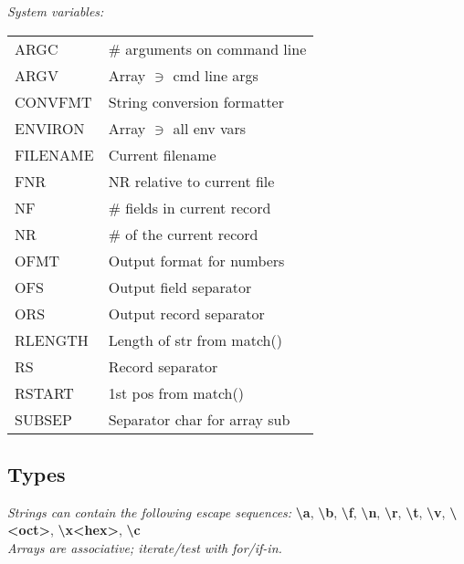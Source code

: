 \textit{System variables:}\\
{\footnotesize \begin{tabular}{l l}
    ARGC	& \# arguments on command line		\\
    ARGV	& Array $\ni$ cmd line args		\\
    CONVFMT	& String conversion formatter		\\
    ENVIRON	& Array $\ni$ all env vars		\\
    FILENAME	& Current filename			\\
    FNR		& NR relative to current file		\\
    NF		& \# fields in current record		\\
    NR		& \# of the current record		\\
    OFMT	& Output format for numbers		\\
    OFS		& Output field separator		\\
    ORS		& Output record separator		\\
    RLENGTH	& Length of str from match()		\\
    RS		& Record separator			\\
    RSTART	& 1st pos from match()			\\
    SUBSEP	& Separator char for array sub		\\
\end{tabular}}




\subsection*{Types}

\textit{Strings can contain the following escape sequences: }\textbf{\textbackslash a}, \textbf{\textbackslash b}, \textbf{\textbackslash f}, \textbf{\textbackslash n}, \textbf{\textbackslash r}, \textbf{\textbackslash t}, \textbf{\textbackslash v}, \textbf{\textbackslash <oct>}, \textbf{\textbackslash x<hex>}, \textbf{\textbackslash c}\\
\textit{Arrays are associative; iterate/test with for/if-in.}\\



\\
\\
\\
\\


